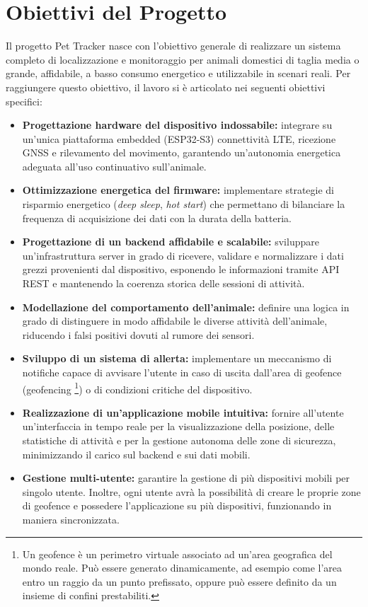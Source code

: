 \documentclass[12pt,a4paper]{article}
\begin{document}
\newpage

\tableofcontents

\newpage

\section{Obiettivi del Progetto}

Il progetto Pet Tracker nasce con l'obiettivo generale di realizzare un sistema completo di localizzazione e monitoraggio per animali domestici di taglia media o grande, affidabile, a basso consumo energetico e utilizzabile in scenari reali. Per raggiungere questo obiettivo, il lavoro si è articolato nei seguenti obiettivi specifici:
\begin{itemize}
    \item \textbf{Progettazione hardware del dispositivo indossabile:} integrare su un'unica piattaforma embedded (ESP32-S3) connettività LTE, ricezione GNSS e rilevamento del movimento, garantendo un'autonomia energetica adeguata all'uso continuativo sull'animale.
    \item \textbf{Ottimizzazione energetica del firmware:} implementare strategie di risparmio energetico (\textit{deep sleep}, \textit{hot start}) che permettano di bilanciare la frequenza di acquisizione dei dati con la durata della batteria.
    \item \textbf{Progettazione di un backend affidabile e scalabile:} sviluppare un'infrastruttura server in grado di ricevere, validare e normalizzare i dati grezzi provenienti dal dispositivo, esponendo le informazioni tramite API REST e mantenendo la coerenza storica delle sessioni di attività.
    \item \textbf{Modellazione del comportamento dell'animale:} definire una logica in grado di distinguere in modo affidabile le diverse attività dell'animale, riducendo i falsi positivi dovuti al rumore dei sensori.
    \item \textbf{Sviluppo di un sistema di allerta:} implementare un meccanismo di notifiche capace di avvisare l'utente in caso di uscita dall'area di geofence (geofencing \footnote{Un geofence è un perimetro virtuale associato ad un'area geografica del mondo reale. Può essere generato dinamicamente, ad esempio come l'area entro un raggio da un punto prefissato, oppure può essere definito da un insieme di confini prestabiliti.}) o di condizioni critiche del dispositivo.
    \item \textbf{Realizzazione di un'applicazione mobile intuitiva:} fornire all'utente un'interfaccia in tempo reale per la visualizzazione della posizione, delle statistiche di attività e per la gestione autonoma delle zone di sicurezza, minimizzando il carico sul backend e sui dati mobili.
    \item \textbf{Gestione multi-utente:} garantire la gestione di più dispositivi mobili per singolo utente. Inoltre, ogni utente avrà la possibilità di creare le proprie zone di geofence e possedere l'applicazione su più dispositivi, funzionando in maniera sincronizzata.
\end{itemize}
\end{document}
